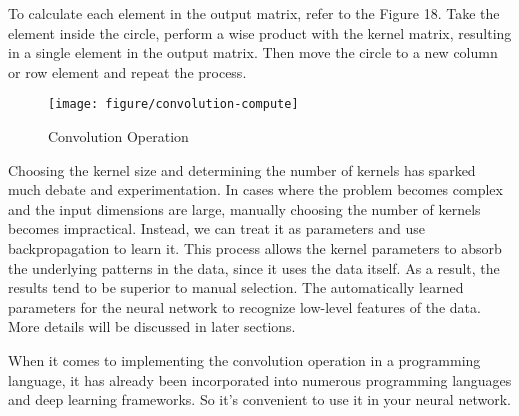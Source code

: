 \documentclass{article}
\begin{document}
To calculate each element in the output matrix, refer to the Figure 18. Take the element inside the circle, perform a wise product with the kernel matrix, resulting in a single element in the output matrix. Then move the circle to a new column or row element and repeat the process.

    \begin{figure}[htbp]
        \centering
        \texttt{[image: figure/convolution-compute]}
        \caption{Convolution Operation}
     \end{figure}


Choosing the kernel size and determining the number of kernels has sparked much debate and experimentation. In cases where the problem becomes complex and the input dimensions are large, manually choosing the number of kernels becomes impractical. Instead, we can treat it as parameters and use backpropagation to learn it. This process allows the kernel parameters to absorb the underlying patterns in the data, since it uses the data itself. As a result, the results tend to be superior to manual selection. The automatically learned parameters for the neural network to recognize low-level features of the data. More details will be discussed in later sections.

When it comes to implementing the convolution operation in a programming language, it has already been incorporated into numerous programming languages and deep learning frameworks. So it's convenient to use it in your neural network. \\
\end{document}
